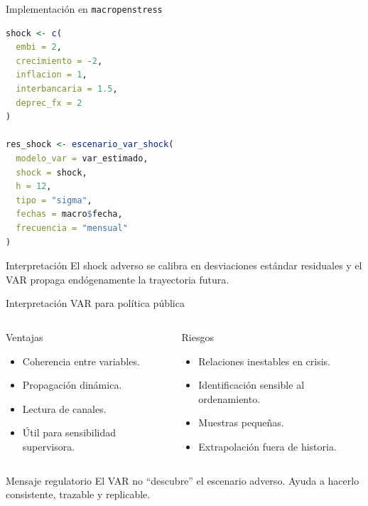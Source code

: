 \documentclass[10pt,aspectratio=169]{beamer}
\begin{document}
\begin{frame}[fragile]{Implementación en \texttt{macropenstress}}

\begin{lstlisting}[language=R,basicstyle=\ttfamily\scriptsize]
shock <- c(
  embi = 2,
  crecimiento = -2,
  inflacion = 1,
  interbancaria = 1.5,
  deprec_fx = 2
)

res_shock <- escenario_var_shock(
  modelo_var = var_estimado,
  shock = shock,
  h = 12,
  tipo = "sigma",
  fechas = macro$fecha,
  frecuencia = "mensual"
)
\end{lstlisting}

\begin{alertblock}{Interpretación}
El shock adverso se calibra en desviaciones estándar residuales
y el VAR propaga endógenamente la trayectoria futura.
\end{alertblock}

\end{frame}
\begin{frame}{Interpretación VAR para política pública}
\begin{columns}
\begin{block}{Ventajas}
\begin{itemize}
  \item Coherencia entre variables.
  \item Propagación dinámica.
  \item Lectura de canales.
  \item Útil para sensibilidad supervisora.
\end{itemize}
\end{block}

\begin{block}{Riesgos}
\begin{itemize}
  \item Relaciones inestables en crisis.
  \item Identificación sensible al ordenamiento.
  \item Muestras pequeñas.
  \item Extrapolación fuera de historia.
\end{itemize}
\end{block}
\end{columns}

\vspace{0.4em}
\begin{block}{Mensaje regulatorio}
El VAR no ``descubre'' el escenario adverso. Ayuda a hacerlo consistente, trazable y replicable.
\end{block}
\end{frame}
\end{document}
